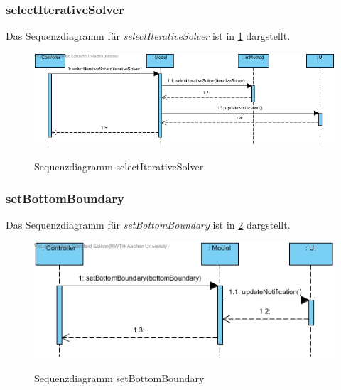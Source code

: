 \subsubsection*{selectIterativeSolver}

Das Sequenzdiagramm für \emph{selectIterativeSolver} ist in \ref{Sequenzdiagramm selectIterativeSolver} dargstellt.

\begin{figure}[H]
	\centering
	\includegraphics[scale=.6]{Bilder/Model__selectIterativeSolver().jpg}\\
	\caption{Sequenzdiagramm selectIterativeSolver}
	\label{Sequenzdiagramm selectIterativeSolver}
\end{figure}

\subsubsection*{setBottomBoundary}

Das Sequenzdiagramm für \emph{setBottomBoundary} ist in \ref{Sequenzdiagramm setBottomBoundary} dargstellt.

\begin{figure}[H]
	\centering
	\includegraphics[scale=.6]{Bilder/Model__setBottomBoundary().jpg}\\
	\caption{Sequenzdiagramm setBottomBoundary}
	\label{Sequenzdiagramm setBottomBoundary}
\end{figure}

